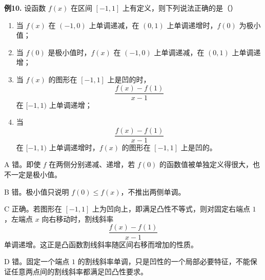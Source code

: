 \begin{problemblock}
\textbf{例10.} 设函数 \(f(x)\) 在区间 \([-1,1]\) 上有定义，则下列说法正确的是（\quad）
\begin{enumerate}[label=\Alph*., leftmargin=2.2em]
\item 当 \(f(x)\) 在 \((-1,0)\) 上单调递减，在 \((0,1)\) 上单调递增时，\(f(0)\) 为极小值；
\item 当 \(f(0)\) 是极小值时，\(f(x)\) 在 \((-1,0)\) 上单调递减，在 \((0,1)\) 上单调递增；
\item 当 \(f(x)\) 的图形在 \([-1,1]\) 上是凹的时，
\[
\frac{f(x)-f(1)}{x-1}
\]
在 \([-1,1)\) 上单调递增；
\item 当
\[
\frac{f(x)-f(1)}{x-1}
\]
在 \([-1,1)\) 上单调递增时，\(f(x)\) 的图形在 \([-1,1]\) 上是凹的。
\end{enumerate}
\end{problemblock}
\begin{solutionblock}
A 错。即使 \(f\) 在两侧分别递减、递增，若 \(f(0)\) 的函数值被单独定义得很大，也不一定是极小值。

B 错。极小值只说明 \(f(0)\le f(x)\)，不推出两侧单调。

C 正确。若图形在 \([-1,1]\) 上为凹向上，即满足凸性不等式，则对固定右端点 \(1\)，左端点 \(x\) 向右移动时，割线斜率
\[
\frac{f(x)-f(1)}{x-1}
\]
单调递增。这正是凸函数割线斜率随区间右移而增加的性质。

D 错。固定一个端点 \(1\) 的割线斜率单调，只是凹性的一个局部必要特征，不能保证任意两点间的割线斜率都满足凹凸性要求。
\end{solutionblock}


